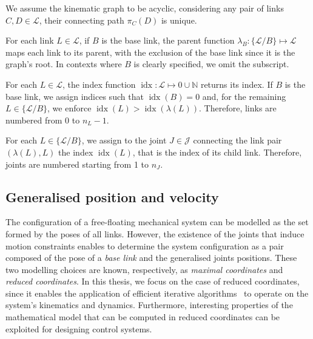 \begin{assumption*}
%
We assume the kinematic graph to be acyclic, \ie considering any pair of links $C, D \in \mathcal{L}$, their connecting path $\pi_C(D)$ is unique.
%
\end{assumption*}

\begin{definition*}
%
For each link $L \in \mathcal{L}$, if $B$ is the base link, the parent function $\lambda_B: \{\mathcal{L} / B\} \mapsto \mathcal{L}$ maps each link to its parent, with the exclusion of the base link since it is the graph's root.
In contexts where $B$ is clearly specified, we omit the subscript.
%
\end{definition*}

\begin{definition*}
%
For each $L \in \mathcal{L}$, the index function $\operatorname{idx}: \mathcal{L} \mapsto 0 \cup \mathbb{N}$ returns its index.
If $B$ is the base link, we assign indices such that $\operatorname{idx}(B) = 0$ and, for the remaining $L \in \{\mathcal{L} / B\}$, we enforce $\operatorname{idx}(L) > \operatorname{idx}(\lambda(L))$.
Therefore, links are numbered from $0$ to $n_L - 1$.
%
\end{definition*}

\begin{definition*}
%
For each $L \in \{\mathcal{L} / B\}$, we assign to the joint $J \in \mathcal{J}$ connecting the link pair $(\lambda(L), L)$ the index $\operatorname{idx}(L)$, that is the index of its child link.
Therefore, joints are numbered starting from 1 to $n_J$.
%
\end{definition*}

\subsection{Generalised position and velocity}

The configuration of a free-floating mechanical system can be modelled as the set formed by the poses of all links.
However, the existence of the joints that induce motion constraints enables to determine the system configuration as a pair composed of the pose of a \emph{base link} and the generalised joints positions.
These two modelling choices are known, respectively, as \emph{maximal coordinates} and \emph{reduced coordinates}.
In this thesis, we focus on the case of	reduced coordinates, since it enables the application of efficient iterative algorithms~\parencite{featherstone_rigid_2008} to operate on the system's kinematics and dynamics.
Furthermore, interesting properties of the mathematical model that can be computed in reduced coordinates can be exploited for designing control systems.

